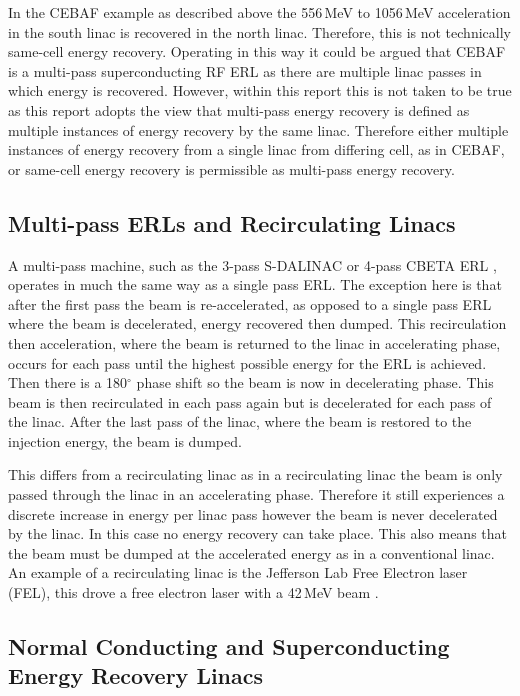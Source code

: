 \documentclass[11pt]{article}
\begin{document}
In the CEBAF example as described above the 556\,MeV to 1056\,MeV acceleration in the south linac is recovered in the north linac. Therefore, this is not technically same-cell energy recovery. Operating in this way it could be argued that CEBAF is a multi-pass superconducting RF ERL as there are multiple linac passes in which energy is recovered. However, within this report this is not taken to be true as this report adopts the view that multi-pass energy recovery is defined as multiple instances of energy recovery by the same linac. Therefore either multiple instances of energy recovery from a single linac from differing cell, as in CEBAF, or same-cell energy recovery is permissible as multi-pass energy recovery.   

\subsection{Multi-pass ERLs and Recirculating Linacs}

A multi-pass machine, such as the 3-pass S-DALINAC \cite{SDALINACipac8} or 4-pass CBETA ERL \cite{IPAC2018CBETA}, operates in much the same way as a single pass ERL. The exception here is that after the first pass the beam is re-accelerated, as opposed to a single pass ERL where the beam is decelerated, energy recovered then dumped. This recirculation then acceleration, where the beam is returned to the linac in accelerating phase, occurs for each pass until the highest possible energy for the ERL is achieved. Then there is a 180$^{\circ}$ phase shift so the beam is now in decelerating phase. This beam is then recirculated in each pass again but is decelerated for each pass of the linac. After the last pass of the linac, where the beam is restored to the injection energy, the beam is dumped.

This differs from a recirculating linac as in a recirculating linac the beam is only passed through the linac in an accelerating phase. Therefore it still experiences a discrete increase in energy per linac pass however the beam is never decelerated by the linac. In this case no energy recovery can take place. This also means that the beam must be dumped at the accelerated energy as in a conventional linac. An example of a recirculating linac is the Jefferson Lab Free Electron laser (FEL), this drove a free electron laser with a 42\,MeV beam \cite{JLabFEL}.

\subsection{Normal Conducting and Superconducting Energy Recovery Linacs}
\label{sec:NCRFvSRF}
\end{document}
